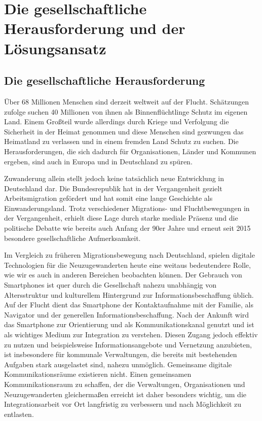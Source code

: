 \documentclass[12pt, a4paper]{article} %
\begin{document}
\hypertarget{die-gesellschaftliche-herausforderung-und-der-luxf6sungsansatz}{%
\section{Die gesellschaftliche Herausforderung und der
Lösungsansatz}\label{die-gesellschaftliche-herausforderung-und-der-luxf6sungsansatz}}

\hypertarget{die-gesellschaftliche-herausforderung}{%
\subsection{Die gesellschaftliche
Herausforderung}\label{die-gesellschaftliche-herausforderung}}

Über 68 Millionen Menschen sind derzeit weltweit auf der Flucht.
Schätzungen zufolge suchen 40 Millionen von ihnen als Binnenflüchtlinge
Schutz im eigenen Land. Einem Großteil wurde allerdings durch Kriege und
Verfolgung die Sicherheit in der Heimat genommen und diese Menschen sind
gezwungen das Heimatland zu verlassen und in einem fremden Land Schutz
zu suchen. Die Herausforderungen, die sich dadurch für Organisationen,
Länder und Kommunen ergeben, sind auch in Europa und in Deutschland zu
spüren.

Zuwanderung allein stellt jedoch keine tatsächlich neue Entwicklung in
Deutschland dar. Die Bundesrepublik hat in der Vergangenheit gezielt
Arbeitsmigration gefördert und hat somit eine lange Geschichte als
Einwanderungsland. Trotz verschiedener Migrations- und Fluchtbewegungen
in der Vergangenheit, erhielt diese Lage durch starke mediale Präsenz
und die politische Debatte wie bereits auch Anfang der 90er Jahre und
erneut seit 2015 besondere gesellschaftliche Aufmerksamkeit.

Im Vergleich zu früheren Migrationsbewegung nach Deutschland, spielen
digitale Technologien für die Neuzugewanderten heute eine weitaus
bedeutendere Rolle, wie wir es auch in anderen Bereichen beobachten
können. Der Gebrauch von Smartphones ist quer durch die Gesellschaft
nahezu unabhängig von Altersstruktur und kulturellem Hintergrund zur
Informationsbeschaffung üblich. Auf der Flucht dient das Smartphone der
Kontaktaufnahme mit der Familie, als Navigator und der generellen
Informationsbeschaffung. Nach der Ankunft wird das Smartphone zur
Orientierung und als Kommunikationskanal genutzt und ist als wichtiges
Medium zur Integration zu verstehen. Diesen Zugang jedoch effektiv zu
nutzen und beispielsweise Informationsangebote und Vernetzung
anzubieten, ist insbesondere für kommunale Verwaltungen, die bereits mit
bestehenden Aufgaben stark ausgelastet sind, nahezu unmöglich.
Gemeinsame digitale Kommunikationsräume existieren nicht. Einen
gemeinsamen Kommunikationsraum zu schaffen, der die Verwaltungen,
Organisationen und Neuzugewanderten gleichermaßen erreicht ist daher
besonders wichtig, um die Integrationsarbeit vor Ort langfristig zu
verbessern und nach Möglichkeit zu entlasten.
\end{document}
